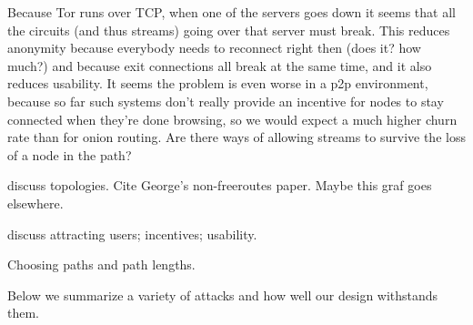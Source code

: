 \documentclass[times,10pt,twocolumn]{article}
\begin{document}
Because Tor runs over TCP, when one of the servers goes down it seems
that all the circuits (and thus streams) going over that server must
break. This reduces anonymity because everybody needs to reconnect
right then (does it? how much?) and because exit connections all break
at the same time, and it also reduces usability. It seems the problem
is even worse in a p2p environment, because so far such systems don't
really provide an incentive for nodes to stay connected when they're
done browsing, so we would expect a much higher churn rate than for
onion routing. Are there ways of allowing streams to survive the loss
of a node in the path?

discuss topologies. Cite George's non-freeroutes paper.  Maybe this
graf goes elsewhere.

discuss attracting users; incentives; usability.

Choosing paths and path lengths.


\label{sec:attacks}

Below we summarize a variety of attacks and how well our design withstands
them.
\end{document}
